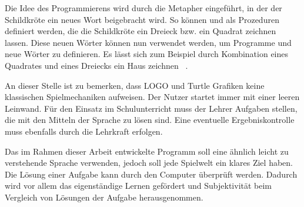Die Idee des Programmierens wird durch die Metapher eingeführt, in der der Schildkröte ein neues Wort beigebracht wird. So können   und   als Prozeduren definiert werden, die die Schildkröte ein Dreieck bzw. ein Quadrat zeichnen lassen. Diese neuen Wörter können nun verwendet werden, um Programme und neue Wörter zu definieren. Es lässt sich zum Beispiel durch Kombination eines Quadrates und eines Dreiecks ein Haus zeichnen ~\cite[12]{papert1980}.

An dieser Stelle ist zu bemerken, dass LOGO und Turtle Grafiken keine klassischen Spielmechaniken aufweisen. Der Nutzer startet immer mit einer leeren Leinwand. Für den Einsatz im Schulunterricht muss der Lehrer Aufgaben stellen, die mit den Mitteln der Sprache zu lösen sind. Eine eventuelle Ergebniskontrolle muss ebenfalls durch die Lehrkraft erfolgen.

Das im Rahmen dieser Arbeit entwickelte Programm soll eine ähnlich leicht zu verstehende Sprache verwenden, jedoch soll jede Spielwelt ein klares Ziel haben. Die Lösung einer Aufgabe kann durch den Computer überprüft werden. Dadurch wird vor allem das eigenständige Lernen gefördert und Subjektivität beim Vergleich von Lösungen der Aufgabe herausgenommen.

